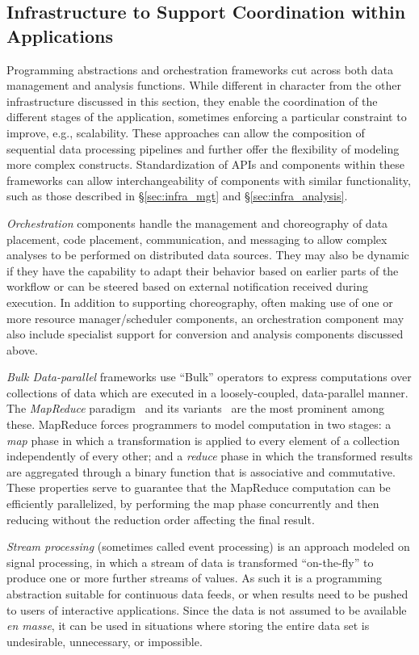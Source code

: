 \documentclass[times]{cpeauth}
\begin{document}
\subsection{Infrastructure to Support Coordination within Applications}
\label{sec:infra_coord}

Programming abstractions and orchestration frameworks cut across both data
management and analysis functions. While different in character from the other
infrastructure discussed in this section, they enable the coordination of the
different stages of the application, sometimes enforcing a particular constraint
to improve, e.g., scalability. These approaches can allow the composition of
sequential data processing pipelines and further offer the flexibility of
modeling more complex constructs.  Standardization of APIs and components within
these frameworks can allow interchangeability of components with similar
functionality, such as those described in \S\ref{sec:infra_mgt} and
\S\ref{sec:infra_analysis}.

{\em Orchestration} components handle the management and choreography of data
placement, code placement, communication, and messaging to allow complex
analyses to be performed on distributed data sources. They may also be dynamic
if they have the capability to adapt their behavior based on earlier parts of
the workflow or can be steered based on external notification received during
execution. In addition to supporting choreography, often making use of one or
more resource manager/scheduler components, an orchestration component may also
include specialist support for conversion and analysis components discussed
above.

{\em Bulk Data-parallel} frameworks use ``Bulk'' operators to express
computations over collections of data which are executed in a loosely-coupled,
data-parallel manner.  The {\em MapReduce} paradigm~\cite{MapReduce} and its
variants~\cite{twister,hmr} are the most prominent among these. MapReduce forces
programmers to model computation in two stages: a \emph{map} phase in which a
transformation is applied to every element of a collection independently of
every other; and a \emph{reduce} phase in which the transformed results are
aggregated through a binary function that is associative and commutative.  These
properties serve to guarantee that the MapReduce computation can be efficiently
parallelized, by performing the map phase concurrently and then reducing without
the reduction order affecting the final result.

{\em Stream processing} (sometimes called event processing) is an approach
modeled on signal processing, in which a stream of data is transformed
``on-the-fly'' to produce one or more further streams of values. As such it is a
programming abstraction suitable for continuous data feeds, or when results need
to be pushed to users of interactive applications. Since the data is not assumed
to be available \textit{en masse}, it can be used in situations where storing
the entire data set is undesirable, unnecessary, or impossible.
\end{document}
